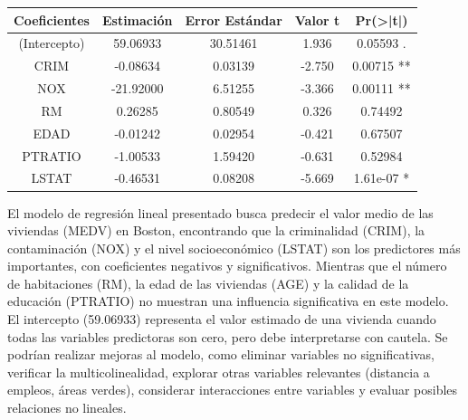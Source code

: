 \documentclass[
  letterpaper,
  DIV=11,
  numbers=noendperiod]{scrartcl}
\begin{document}
\begin{table}[h!]
\centering
\begin{tabular}{|c|c|c|c|c|}
\hline
\textbf{Coeficientes} & \textbf{Estimación} & \textbf{Error Estándar} & \textbf{Valor t} & \textbf{Pr(>|t|)} \\ \hline
(Intercepto) & 59.06933 & 30.51461 & 1.936 & 0.05593 . \\ \hline
CRIM & -0.08634 & 0.03139 & -2.750 & 0.00715 ** \\ \hline
NOX & -21.92000 & 6.51255 & -3.366 & 0.00111 ** \\ \hline
RM & 0.26285 & 0.80549 & 0.326 & 0.74492 \\ \hline
EDAD & -0.01242 & 0.02954 & -0.421 & 0.67507 \\ \hline
PTRATIO & -1.00533 & 1.59420 & -0.631 & 0.52984 \\ \hline
LSTAT & -0.46531 & 0.08208 & -5.669 & 1.61e-07 * \\ \hline
\end{tabular}
\end{table}

El modelo de regresión lineal presentado busca predecir el valor medio
de las viviendas (MEDV) en Boston, encontrando que la criminalidad
(CRIM), la contaminación (NOX) y el nivel socioeconómico (LSTAT) son los
predictores más importantes, con coeficientes negativos y
significativos. Mientras que el número de habitaciones (RM), la edad de
las viviendas (AGE) y la calidad de la educación (PTRATIO) no muestran
una influencia significativa en este modelo. El intercepto (59.06933)
representa el valor estimado de una vivienda cuando todas las variables
predictoras son cero, pero debe interpretarse con cautela. Se podrían
realizar mejoras al modelo, como eliminar variables no significativas,
verificar la multicolinealidad, explorar otras variables relevantes
(distancia a empleos, áreas verdes), considerar interacciones entre
variables y evaluar posibles relaciones no lineales.
\end{document}
